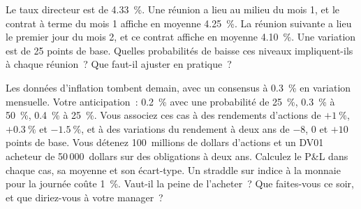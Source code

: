 \begin{question}\label{iq:iv2:macro-market-knowledge-and-pitches:24}
Le taux directeur est de 4.33~\%. Une réunion a lieu au milieu du mois 1, et le contrat à terme du mois 1 affiche en moyenne 4.25~\%. La réunion suivante a lieu le premier jour du mois 2, et ce contrat affiche en moyenne 4.10~\%. Une variation est de 25 points de base. Quelles probabilités de baisse ces niveaux impliquent-ils à chaque réunion~? Que faut-il ajuster en pratique~?
\end{question}

\begin{question}\label{iq:iv2:macro-market-knowledge-and-pitches:25}
Les données d'inflation tombent demain, avec un consensus à 0.3~\% en variation mensuelle. Votre anticipation~: 0.2~\% avec une probabilité de 25~\%, 0.3~\% à 50~\%, 0.4~\% à 25~\%. Vous associez ces cas à des rendements d'actions de $+1~\%$, $+0.3~\%$ et $-1.5~\%$, et à des variations du rendement à deux ans de $-8$, 0 et $+10$ points de base. Vous détenez 100~millions de dollars d'actions et un DV01 acheteur de 50\,000~dollars sur des obligations à deux ans. Calculez le P\&L dans chaque cas, sa moyenne et son écart-type. Un straddle sur indice à la monnaie pour la journée coûte 1~\%. Vaut-il la peine de l'acheter~? Que faites-vous ce soir, et que diriez-vous à votre manager~?
\end{question}
